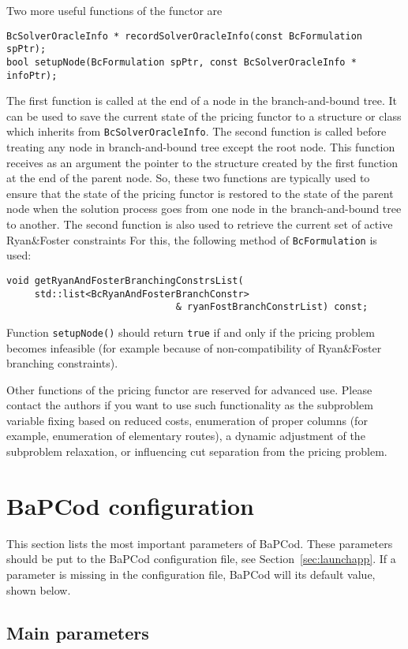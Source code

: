 \documentclass[10pt,a4paper]{article}
\newcommand{\bc}{BaPCod\xspace}
\begin{document}
Two more useful functions of the functor are
\begin{lstlisting}
BcSolverOracleInfo * recordSolverOracleInfo(const BcFormulation spPtr);
bool setupNode(BcFormulation spPtr, const BcSolverOracleInfo * infoPtr);
\end{lstlisting}
The first function is called at the end of a node in the branch-and-bound tree. It can be used to save the current state
of the pricing functor to a structure or class which inherits from \verb+BcSolverOracleInfo+. The second function is
called before treating any node in branch-and-bound tree except the root node. This function receives as an argument the
pointer to the structure created by the first function at the end of the parent node. So, these two functions are
typically used to ensure that the state of the pricing functor is restored to the state of the parent node when the
solution process goes from one node in the branch-and-bound tree to another. The second function is also used to
retrieve the current set of active Ryan\&Foster constraints For this, the following method of \verb+BcFormulation+ is
used:
\begin{lstlisting}
void getRyanAndFosterBranchingConstrsList(
     std::list<BcRyanAndFosterBranchConstr> 
                              & ryanFostBranchConstrList) const;
\end{lstlisting}
Function \verb+setupNode()+ should return \verb+true+ if and only if the pricing problem becomes infeasible (for example
because of non-compatibility of Ryan\&Foster branching constraints).

Other functions of the pricing functor are reserved for advanced use. Please contact the authors if you want to use such
functionality as the subproblem variable fixing based on reduced costs, enumeration of proper columns (for example,
enumeration of elementary routes), a dynamic adjustment of the subproblem relaxation, or influencing cut separation from
the pricing problem.
 
\section{\bc configuration}
\label{sec:config}

This section lists the most important parameters of \bc. These parameters should be put to the \bc configuration file,
see Section~\ref{sec:launchapp}. If a parameter is missing in the configuration file, BaPCod will its default value,
shown below.

\subsection{Main parameters}
\label{sec:mainconfig}
\end{document}
